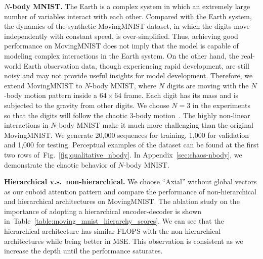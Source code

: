 \documentclass{article}
\newcommand{\tabref}[1]{Table~\ref{#1}}
\newcommand{\figref}[1]{Fig.~\ref{#1}}
\renewcommand{\paragraph}[1]{\textbf{#1. }}
\def\nbody{$N$-body MNIST}
\begin{document}
\paragraph{\nbody{}}
The Earth is a complex system in which an extremely large number of variables interact with each other.
Compared with the Earth system, the dynamics of the synthetic MovingMNIST dataset, in which the digits move independently with constant speed, is over-simplified.
Thus, achieving good performance on MovingMNIST does not imply that the model is capable of modeling complex interactions in the Earth system.
On the other hand, the real-world Earth observation data, though experiencing rapid development, are still noisy and may not provide useful insights for model development.
Therefore, we extend MovingMNIST to \nbody{}, where $N$ digits are moving with the $N$-body motion pattern inside a $64 \times 64$ frame. Each digit has its mass and is subjected to the gravity from other digits.
We choose $N=3$ in the experiments so that the digits will follow the chaotic $3$-body motion~\cite{mj2006three}. The highly non-linear interactions in \nbody{} make it much more challenging than the original MovingMNIST. We generate 20,000 sequences for training, 1,000 for validation and 1,000 for testing. Perceptual examples of the dataset can be found at the first two rows of~\figref{fig:qualitative_nbody}. In Appendix~\ref{sec:chaos-nbody}, we demonstrate the chaotic behavior of \nbody{}.

\paragraph{Hierarchical v.s.\ non-hierarchical}
We choose ``Axial'' without global vectors as our cuboid attention pattern and compare the performance of non-hierarchical and hierarchical architectures on MovingMNIST. 
The ablation study on the importance of adopting a hierarchical encoder-decoder is shown in~\tabref{table:moving_mnist_hierarchy_scores}. We can see that the hierarchical architecture has similar FLOPS with the non-hierarchical architectures while being better in MSE. This observation is consistent as we increase the depth until the performance saturates.
\end{document}
